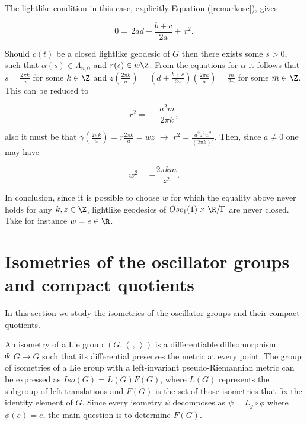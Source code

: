 \documentclass[12pt]{amsart}
\newcommand{\lela}{\left \langle}
\newcommand{\rira}{\right \rangle}
\theoremstyle{plain}
\theoremstyle{definition}
\theoremstyle{remark}
\begin{document}
	The lightlike condition in this case, explicitly Equation (\ref{remarkosc}), gives
	
	\begin{equation*}
		0 = \, 2 a d + \frac{b+c}{2a} + \, r^2. 
	\end{equation*}
	
	Should $c(t)$ be a closed lightlike geodesic of $G$ then there exists some  $s>0$, such that $\alpha(s) \in \Lambda_{n,0}$ and $r(s) \in w \Z$. From the equations for  $\alpha$ it follows that $s=\frac{2 \pi k}{a}$ for some $k \in \Z$ and $z(\frac{2 \pi k}{a})=(d+\frac{b+c}{2 a})(\frac{2 \pi k}{a})=\frac{m}{2n}$ for some $m \in \Z$. This can be reduced to 
	
	\begin{equation*}
		r^2 = \, - \frac{a^2 m}{2 \pi k},
	\end{equation*}
	
	also it must be that $\gamma(\frac{2 \pi k}{a}) = r \frac{2 \pi k}{a} = w z$ $\rightarrow$ $r^2 = \frac{a^2 z^2 w^2}{(2 \pi k)^2}$. Then,  since $a \neq 0$ one may have
	
	\begin{equation*}
		w^2 = -\frac{2 \pi k m}{z^2}.
	\end{equation*}
	
	In conclusion, since it is possible to choose $w$ for which the equality above never holds  for any $k,z \in \Z$, lightlike geodesics of $Osc_1(1) \times \R/\Gamma$ are never closed. Take for instance  $w = e\in \R$. 
	
	
	
	
	\section{Isometries of the oscillator groups and compact quotients}
	In this section we study the isometries of the oscillator groups and their compact quotients. 
	
An isometry of  a Lie group $(G, \lela\,,\,\rira)$ is a differentiable diffeomorphism $\Psi:G \to G$ such that its differential preserves the metric at every point.  
    The group of isometries of a Lie group with a left-invariant pseudo-Riemannian  metric can be expressed as $Iso(G) = L(G)F(G)$, where $L(G)$ represents the subgroup of left-translations and $F(G)$ is the set of  those isometries that fix the identity element of $G$.  Since every isometry $\psi$ decomposes as $\psi = L_g \circ \phi$ where $\phi(e)=e$, the main question is to determine $F(G)$. 
    
\end{document}
